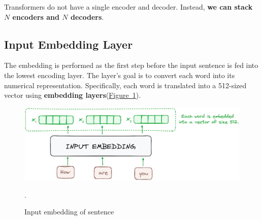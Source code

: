 \documentclass[12pt]{article}
\begin{document}
Transformers do not have a single encoder and decoder. Instead, \textbf{we can stack $N$ encoders and $N$ 
decoders}.

\subsection{Input Embedding Layer}
The embedding is performed as the first step before the input sentence is fed into the lowest encoding layer. 
The layer's goal is to convert each word into its numerical representation. Specifically, each word is 
translated into a 512-sized vector using \textbf{embedding layers}(\hyperref[fig:input_embedding_mechanism]{Figure~\ref*{fig:input_embedding_mechanism}}).

\begin{figure}
    \centering
    \includegraphics[width=.7\textwidth]{Images/transformer_input_embedding.png}
    \caption{Input embedding of sentence}.
    \label{fig:input_embedding_mechanism}
\end{figure}
\end{document}
